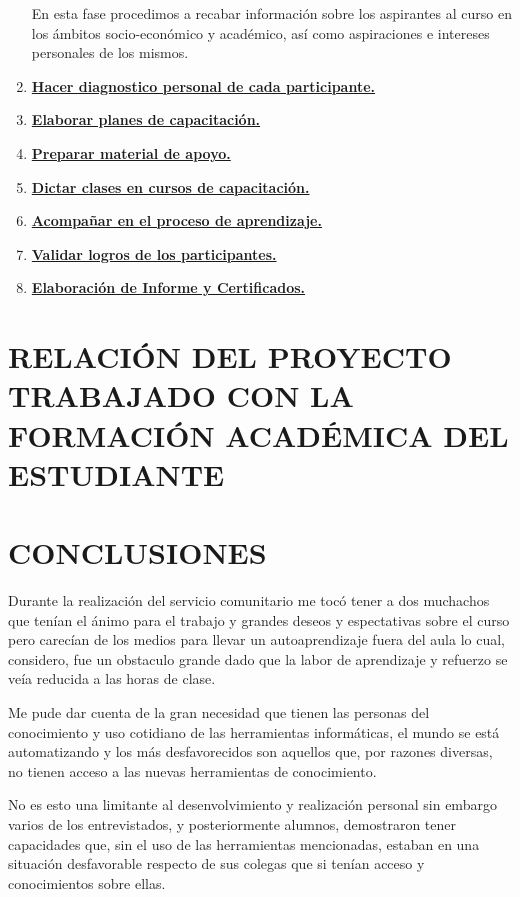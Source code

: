 \documentclass[letterpaper,12pt]{article}
\begin{document}
\begin{enumerate}
                En esta fase procedimos a recabar información sobre los aspirantes al curso en los ámbitos socio-económico y académico, así como aspiraciones e intereses personales de los mismos.
                
                \item \underline{\textbf{Hacer diagnostico personal de cada participante.}}
                \item \underline{\textbf{Elaborar planes de capacitación.}}
                \item \underline{\textbf{Preparar material de apoyo.}}
                \item \underline{\textbf{Dictar clases en cursos de capacitación.}}
                \item \underline{\textbf{Acompañar en el proceso de aprendizaje.}}
                \item \underline{\textbf{Validar logros de los participantes.}}
                \item \underline{\textbf{Elaboración de Informe y Certificados.}}
            \end{enumerate}
	\pagebreak
	
	\section{RELACIÓN DEL PROYECTO TRABAJADO CON LA FORMACIÓN ACADÉMICA	DEL\\ ESTUDIANTE}
	\pagebreak
	
	\section{CONCLUSIONES}
    Durante la realización del servicio comunitario me tocó tener a dos muchachos que tenían el ánimo para el trabajo y grandes deseos y espectativas sobre el curso pero carecían de los medios para llevar un autoaprendizaje fuera del aula lo cual, considero,
    fue un obstaculo grande dado que la labor de aprendizaje y refuerzo se veía reducida a las horas de clase.
    
    Me pude dar cuenta de la gran necesidad que tienen las personas del conocimiento y uso cotidiano de las herramientas informáticas, el mundo se está automatizando y los más desfavorecidos son aquellos que, por razones diversas, no tienen acceso a las nuevas herramientas de conocimiento.
    
    No es esto una limitante al desenvolvimiento y realización personal sin embargo varios de los entrevistados, y posteriormente alumnos, demostraron tener capacidades que, sin el uso de las herramientas mencionadas, estaban en una situación desfavorable respecto de sus colegas que si tenían acceso y conocimientos sobre ellas.
    
\end{document}
